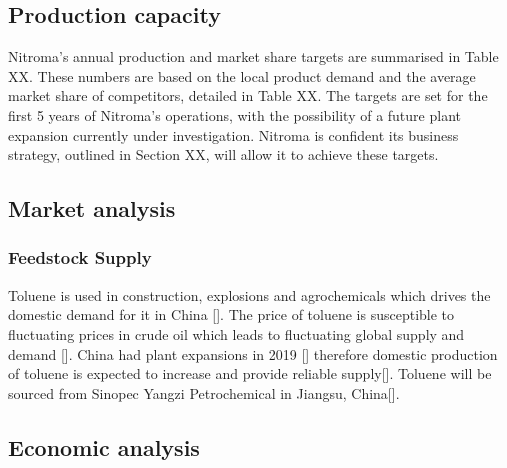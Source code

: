 \subsection{Production capacity}
Nitroma’s annual production and market share targets are summarised in Table XX. These numbers are based on the local product demand and the average market share of competitors, detailed in Table XX. The targets are set for the first 5 years of Nitroma’s operations, with the possibility of a future plant expansion currently under investigation. Nitroma is confident its business strategy, outlined in Section XX, will allow it to achieve these targets. 

\subsection{Market analysis}

\subsubsection{Feedstock Supply}
Toluene is used in construction, explosions and agrochemicals which drives the domestic demand for it in China []. The price of toluene is susceptible to fluctuating prices in crude oil which leads to fluctuating global supply and demand []. China had plant expansions in 2019 [] therefore domestic production of toluene is expected to increase and provide reliable supply[]. Toluene will be sourced from Sinopec Yangzi Petrochemical in Jiangsu, China[].

\subsection{Economic analysis}